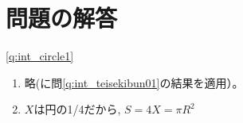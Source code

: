 \section*{問題の解答}

\ref{q:int_circle1} 
\begin{enumerate}
\item 略(に問\ref{q:int_teisekibun01}の結果を適用）。
\item $X$は円の1/4だから, $S=4X=\pi R^2$
\end{enumerate}
\mv








